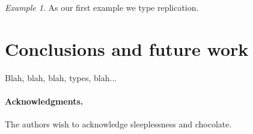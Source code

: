 \documentclass[]{amsart}
\theoremstyle{definition}
\theoremstyle{remark}
\newtheorem{example}[thm]{Example}
\numberwithin{equation}{subsection}
\begin{document}
\begin{example}
	As our first example we type replication.
\end{example}

\section{Conclusions and future work}

Blah, blah, blah, types, blah...

\paragraph{Acknowledgments.}
The authors wish to acknowledge sleeplessness and chocolate.





\end{document}
